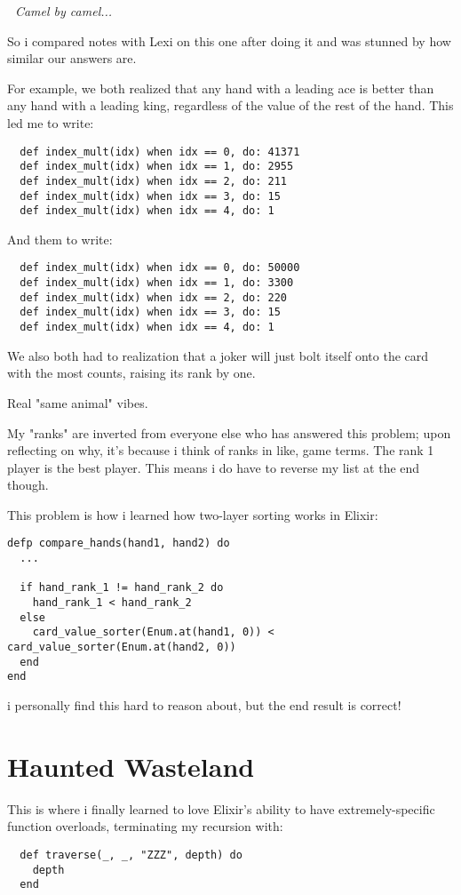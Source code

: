 \documentclass{article}
\begin{document}
\textit{🎵 Camel by camel...~}

So i compared notes with Lexi on this one after doing it and was stunned by how similar our answers are.

For example, we both realized that any hand with a leading ace is better than any hand with a leading king, regardless of the value of the rest of the hand. This led me to write:
\begin{verbatim}
  def index_mult(idx) when idx == 0, do: 41371
  def index_mult(idx) when idx == 1, do: 2955
  def index_mult(idx) when idx == 2, do: 211
  def index_mult(idx) when idx == 3, do: 15
  def index_mult(idx) when idx == 4, do: 1
\end{verbatim}

And them to write:
\begin{verbatim}
  def index_mult(idx) when idx == 0, do: 50000
  def index_mult(idx) when idx == 1, do: 3300
  def index_mult(idx) when idx == 2, do: 220
  def index_mult(idx) when idx == 3, do: 15
  def index_mult(idx) when idx == 4, do: 1
\end{verbatim}

We also both had to realization that a joker will just bolt itself onto the card with the most counts, raising its rank by one.

Real "same animal" vibes.

My "ranks" are inverted from everyone else who has answered this problem; upon reflecting on why, it's because i think of ranks in like, game terms. The rank 1 player is the best player. This means i do have to reverse my list at the end though.

This problem is how i learned how two-layer sorting works in Elixir:
\begin{verbatim}
defp compare_hands(hand1, hand2) do
  ...

  if hand_rank_1 != hand_rank_2 do
    hand_rank_1 < hand_rank_2
  else
    card_value_sorter(Enum.at(hand1, 0)) < card_value_sorter(Enum.at(hand2, 0))
  end
end
\end{verbatim}

i personally find this hard to reason about, but the end result is correct!

\section{Haunted Wasteland}

This is where i finally learned to love Elixir's ability to have extremely-specific function overloads, terminating my recursion with:
\begin{verbatim}
  def traverse(_, _, "ZZZ", depth) do
    depth
  end
\end{verbatim}
\end{document}
